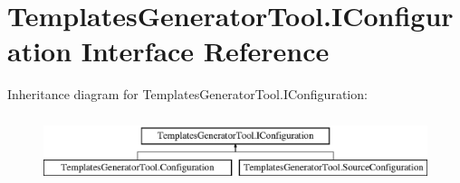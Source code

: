 \hypertarget{interface_templates_generator_tool_1_1_i_configuration}{}\section{Templates\+Generator\+Tool.\+I\+Configuration Interface Reference}
\label{interface_templates_generator_tool_1_1_i_configuration}
Inheritance diagram for Templates\+Generator\+Tool.\+I\+Configuration\+:\begin{figure}[H]
\begin{center}
\leavevmode
\includegraphics[height=2.000000cm]{interface_templates_generator_tool_1_1_i_configuration}
\end{center}
\end{figure}
